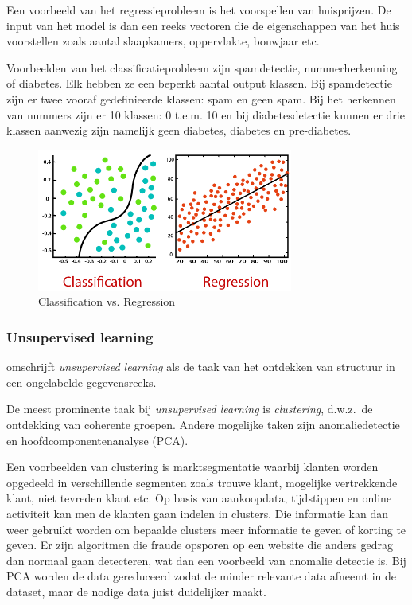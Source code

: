 Een voorbeeld van het regressieprobleem is het voorspellen van huisprijzen. De input van het model is dan een reeks vectoren die de eigenschappen van het huis voorstellen zoals aantal slaapkamers, oppervlakte, bouwjaar etc.

Voorbeelden van het classificatieprobleem zijn spamdetectie, nummerherkenning of diabetes. Elk hebben ze een beperkt aantal output klassen. Bij spamdetectie zijn er twee vooraf gedefinieerde klassen: spam en geen spam. Bij het herkennen van nummers zijn er 10 klassen: 0 t.e.m. 10 en bij diabetesdetectie kunnen er drie klassen aanwezig zijn namelijk geen diabetes, diabetes en pre-diabetes.

\begin{figure}
    \centering
    \includegraphics[width=0.75\textwidth]{./img/classification_regression}
    \caption{\label{fig:classification_vs_regression} Classification vs. Regression~\autocite{JavaTpoint2021}}
\end{figure}

\subsubsection{Unsupervised learning}
\textcite{Lievens2021} omschrijft \textit{unsupervised learning} als de taak van het ontdekken van structuur in een ongelabelde gegevensreeks.

De meest prominente taak bij \textit{unsupervised learning} is \textit{clustering}, d.w.z.\ de ontdekking van coherente
groepen. Andere mogelijke taken zijn anomaliedetectie en hoofdcomponentenanalyse (PCA).

Een voorbeelden van clustering is marktsegmentatie waarbij klanten worden opgedeeld in verschillende segmenten zoals trouwe klant, mogelijke vertrekkende klant, niet tevreden klant etc. Op basis van aankoopdata, tijdstippen en online activiteit kan men de klanten gaan indelen in clusters. Die informatie kan dan weer gebruikt worden om bepaalde clusters meer informatie te geven of korting te geven.
Er zijn algoritmen die fraude opsporen op een website die anders gedrag dan normaal gaan detecteren, wat dan een voorbeeld van anomalie detectie is.
Bij PCA worden de data gereduceerd zodat de minder relevante data afneemt in de dataset, maar de nodige data juist duidelijker maakt.


